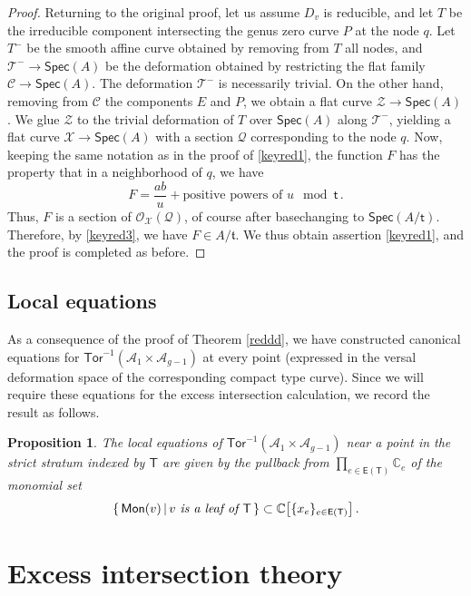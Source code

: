 \documentclass[11pt]{amsart}
\newtheorem{prop}[thm]{Proposition}
\theoremstyle{definition}
\newcommand{\A}{\mathcal{A}}
\newcommand{\Xb}{\mathcal{X}}
\newcommand{\Tor}{\mathsf{Tor}}
\begin{document}
{\begin{proof}
Returning to the original proof, let us assume $D_v$ is reducible, and let $T$ be the irreducible component intersecting the genus zero curve $P$ at the node $q$. Let $T^-$ be the smooth affine curve obtained by removing from $T$ all nodes, and $\mathcal T^-\to \textsf{Spec}(A)$ be the deformation obtained by restricting the flat family $\mathcal C\to \textsf{Spec} (A)$. The deformation $\mathcal T^-$ is necessarily trivial. On the other hand, removing from $\mathcal C$ the components $E$ and $P$, we obtain a flat curve $\mathcal Z\to \mathsf{Spec}(A)$. We glue $\mathcal Z$ to the trivial deformation of $T$ over $\textsf{Spec}(A)$ along $\mathcal T^-$, yielding a flat curve $\mathcal X\to \mathsf{Spec}(A)$ with a section $\mathcal Q$ corresponding to the node $q$. Now, keeping the same notation as in the proof of \eqref{keyred1}, the function $F$ has the property that in a neighborhood of $q$, we have $$F=\frac{ab}{u}+\text{positive powers of }u \mod \mathsf t\, .$$ Thus, $F$ is a section of $\mathcal O_{\Xb}(\mathcal Q)$, of course after basechanging to $\textsf{Spec}(A/\mathsf t)$. Therefore, by \eqref{keyred3}, we have $F\in A/\mathfrak t$. We thus obtain assertion \eqref{keyred1}, and the proof is completed as before. 
\end{proof}

 
\subsection{Local equations}
As a consequence of the proof of Theorem \ref{reddd},
we have constructed canonical equations for 
$\Tor^{-1}(\A_1\times \A_{g-1})$ 
at every point (expressed in 
the
versal deformation space of the corresponding
compact type curve). Since we will 
require these equations for
the excess intersection calculation, we
record the result as follows.

\begin{prop}\label{localequations} The local equations of $\Tor^{-1}(\A_1\times \A_{g-1})$ near a point in the strict stratum indexed by $\mathsf{T}$ are given by the pullback
from $\prod_{e\in \mathsf{E}(\mathsf{T})} \mathbb{C}_e$
of
the 
monomial set
$$\{ \, \mathsf{Mon}(v) \, | \,  \text{\em $v$ is a leaf of $\mathsf{T}$}\, \} \subset \mathbb{C}\big[\{x_e\}_{e\in \mathsf{E}(\mathsf{T})}\big]\, .$$
\end{prop}





\section{Excess intersection theory}\label{excesstheory}
}
\end{document}
